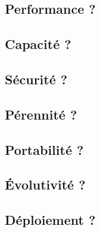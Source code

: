 \subsection{Performance ?}

\subsection{Capacité ?}

\subsection{Sécurité ?}

\subsection{Pérennité ?}

\subsection{Portabilité ?}

\subsection{Évolutivité ?}

\subsection{Déploiement ?}

